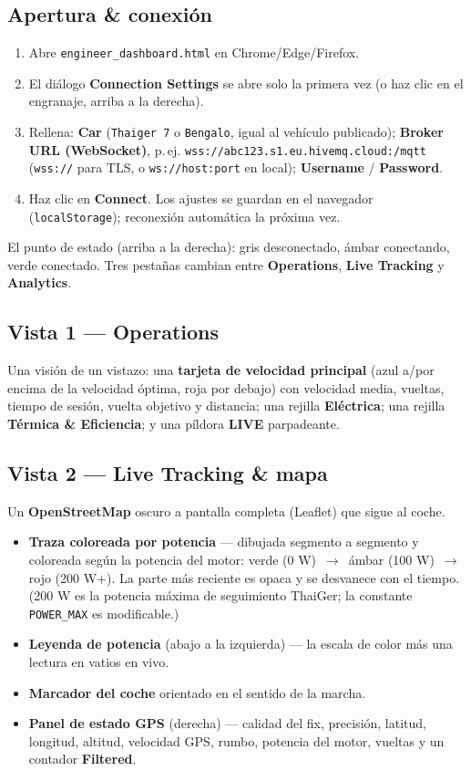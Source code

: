 \documentclass[11pt,a4paper,oneside]{report}
\newcommand{\arrow}{\,$\rightarrow$\,}
\newcommand{\code}[1]{\texttt{#1}}
\begin{document}
\subsection{Apertura \& conexión}
\begin{enumerate}
  \item Abre \code{engineer\_dashboard.html} en Chrome/Edge/Firefox.
  \item El diálogo \textbf{Connection Settings} se abre solo la primera vez (o haz
    clic en el engranaje, arriba a la derecha).
  \item Rellena: \textbf{Car} (\code{Thaiger 7} o \code{Bengalo}, igual al vehículo
    publicado); \textbf{Broker URL (WebSocket)}, p.\,ej.
    \code{wss://abc123.s1.eu.hivemq.cloud:/mqtt} (\code{wss://} para TLS, o
    \code{ws://host:port} en local); \textbf{Username} / \textbf{Password}.
  \item Haz clic en \textbf{Connect}. Los ajustes se guardan en el navegador
    (\code{localStorage}); reconexión automática la próxima vez.
\end{enumerate}
El punto de estado (arriba a la derecha): gris desconectado, ámbar conectando, verde
conectado. Tres pestañas cambian entre \textbf{Operations}, \textbf{Live Tracking} y
\textbf{Analytics}.

\subsection{Vista 1 --- Operations}
Una visión de un vistazo: una \textbf{tarjeta de velocidad principal} (azul a/por
encima de la velocidad óptima, roja por debajo) con velocidad media, vueltas, tiempo
de sesión, vuelta objetivo y distancia; una rejilla \textbf{Eléctrica}; una rejilla
\textbf{Térmica \& Eficiencia}; y una píldora \textbf{LIVE} parpadeante.

\subsection{Vista 2 --- Live Tracking \& mapa}
Un \textbf{OpenStreetMap} oscuro a pantalla completa (Leaflet) que sigue al coche.
\begin{itemize}
  \item \textbf{Traza coloreada por potencia} --- dibujada segmento a segmento y
    coloreada según la potencia del motor: \textcolor{tgreen}{verde (0 W)} \arrow{}
    \textcolor{tamber}{ámbar (100 W)} \arrow{} \textcolor{tred}{rojo (200 W+)}. La
    parte más reciente es opaca y se desvanece con el tiempo. (200 W es la potencia
    máxima de seguimiento ThaiGer; la constante \code{POWER\_MAX} es modificable.)
  \item \textbf{Leyenda de potencia} (abajo a la izquierda) --- la escala de color
    más una lectura en vatios en vivo.
  \item \textbf{Marcador del coche} orientado en el sentido de la marcha.
  \item \textbf{Panel de estado GPS} (derecha) --- calidad del fix, precisión,
    latitud, longitud, altitud, velocidad GPS, rumbo, potencia del motor, vueltas y
    un contador \textbf{Filtered}.
\end{itemize}
\end{document}
